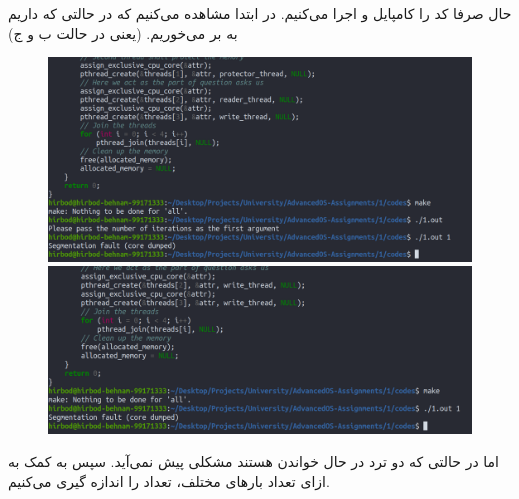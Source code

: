 حال صرفا کد را کامپایل و اجرا می‌کنیم. در ابتدا مشاهده می‌کنیم که در حالتی که
داریم به
بر می‌خوریم.
(یعنی در حالت ب و ج)
\begin{figure}[H]
    \centering
    \includegraphics[scale=0.5]{pics/segfault1.png}
    \includegraphics[scale=0.5]{pics/segfault2.png}
\end{figure}

اما در حالتی که دو ترد در حال خواندن هستند مشکلی پیش نمی‌آید.
سپس به کمک 
به ازای تعداد بار‌های مختلف،‌ تعداد
را اندازه گیری می‌کنیم.